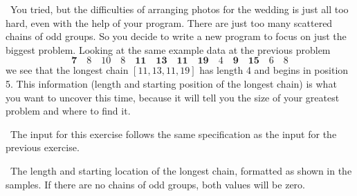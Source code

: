 

\Question\ You tried, but the difficulties of arranging photos for the wedding is just all
too hard, even with the help of your program. There are just too many scattered chains of
odd groups. So you decide to write a new program to focus on just the biggest problem.
Looking at the same example data at the previous problem \[
  \mathbf{7}
  \quad 8 \quad 10 \quad 8
  \quad \mathbf{11} \quad \mathbf{13} \quad \mathbf{11} \quad \mathbf{19}
  \quad 4
  \quad \mathbf{9} \quad \mathbf{15}
  \quad 6 \quad 8
\]
we see that the longest chain $[11,13,11,19]$ has length 4 and begins in position 5. This
information (length and starting position of the longest chain) is what you want to
uncover this time, because it will tell you the size of your greatest problem and where to
find it.

\Input\ The input for this exercise follows the same specification as the input for the
previous exercise.

\Output\ The length and starting location of the longest chain, formatted as shown in the
samples. If there are no chains of odd groups, both values will be zero.

\Sample

{\small
{}
} %

